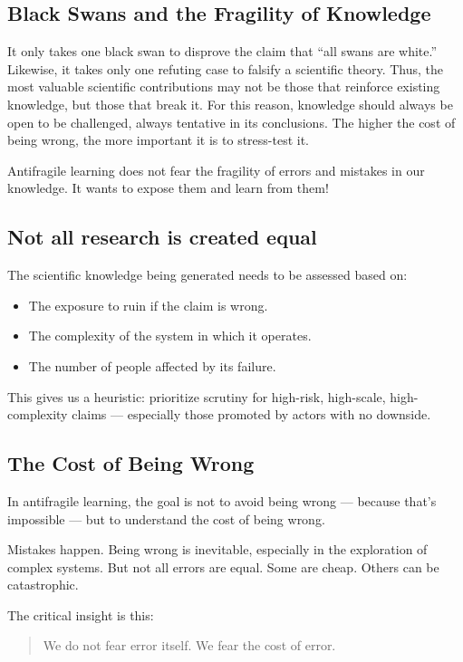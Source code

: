 \documentclass{article}
\begin{document}
\subsection{Black Swans and the Fragility of Knowledge}

It only takes one black swan to disprove the claim that “all swans are white.” Likewise, it takes only one refuting case to falsify a scientific theory. Thus, the most valuable scientific contributions may not be those that reinforce existing knowledge, but those that break it. For this reason, knowledge should always be open to be challenged, always tentative in its conclusions. The higher the cost of being wrong, the more important it is to stress-test it.

Antifragile learning does not fear the fragility of errors and mistakes in our knowledge. It wants to expose them and learn from them!

\subsection{Not all research is created equal}

The scientific knowledge being generated needs to be assessed based on:
\begin{itemize}
	\item The exposure to ruin if the claim is wrong.
	\item The complexity of the system in which it operates.
	\item The number of people affected by its failure.
\end{itemize}

This gives us a heuristic: prioritize scrutiny for high-risk, high-scale, high-complexity claims — especially those promoted by actors with no downside.

\subsection{The Cost of Being Wrong}

In antifragile learning, the goal is not to avoid being wrong — because that’s impossible — but to understand the cost of being wrong.

Mistakes happen. Being wrong is inevitable, especially in the exploration of complex systems. But not all errors are equal. Some are cheap. Others can be catastrophic. 

The critical insight is this:
\begin{quote}
	We do not fear error itself. We fear the cost of error.
\end{quote}
\end{document}
